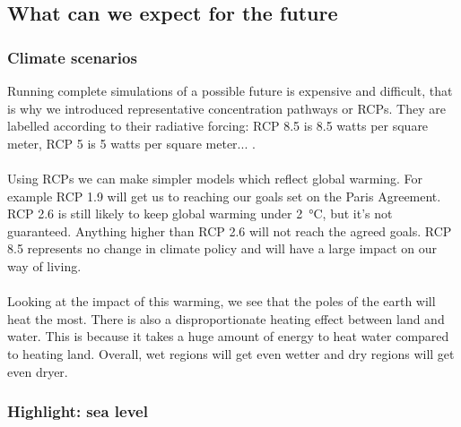 \documentclass[../summary.tex]{subfiles}
\begin{document}
		\subsection{What can we expect for the future}
			\subsubsection{Climate scenarios}
				Running complete simulations of a possible future is expensive and difficult, that is why we introduced representative concentration pathways or RCPs. They are labelled according to their radiative forcing: RCP 8.5 is 8.5 watts per square meter, RCP 5 is 5 watts per square meter... . 
				\\\\
				Using RCPs we can make simpler models which reflect global warming. For example RCP 1.9 will get us to reaching our goals set on the Paris Agreement. RCP 2.6 is still likely to keep global warming under \SI{2}{\degreeCelsius}, but it's not guaranteed. Anything higher than RCP 2.6 will not reach the agreed goals. RCP 8.5 represents no change in climate policy and will have a large impact on our way of living. 
				\\\\
				Looking at the impact of this warming, we see that the poles of the earth will heat the most. There is also a disproportionate heating effect between land and water. This is because it takes a huge amount of energy to heat water compared to heating land. Overall, wet regions will get even wetter and dry regions will get even dryer. 
				
			\newpage
			\subsubsection{Highlight: sea level}
\end{document}

